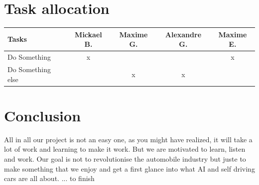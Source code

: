 \documentclass[12pt]{article}
\begin{document}
\section {Task allocation}
\begin{tabular}{|l|c|c|c|c|}
  \hline  Tasks & Mickael B. & Maxime G. & Alexandre G. &  Maxime E.\\
  \hline  Do Something & x &  &  & x \\
  \hline  Do Something else &  & x & x & \\
  \hline
\end{tabular}

\section {Conclusion}
All in all our project is not an easy one, as you might have realized, it will take a lot of work and learning to make it work. But we are motivated to learn, listen and work. Our goal is not to revolutionise the automobile industry but juste to make something that we enjoy and get a first glance into what AI and self driving cars are all about. 
... to finish
\end{document}
